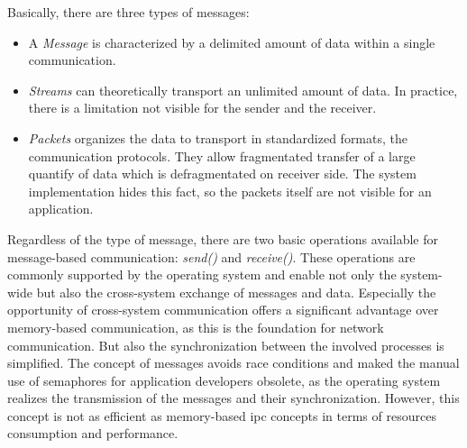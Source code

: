 Basically, there are three types of messages:
\begin{itemize}
    \item A \textit{Message} is characterized by a delimited amount of data within a single communication.
    \item \textit{Streams} can theoretically transport an unlimited amount of data. In practice, there is a limitation not visible for the sender and the receiver.
    \item \textit{Packets} organizes the data to transport in standardized formats, the communication protocols. They allow fragmentated transfer of a large quantify of data which is defragmentated on receiver side. The system implementation hides this fact, so the packets itself are not visible for an application\cite{glatz2015betriebssysteme}. 
\end{itemize}


Regardless of the type of message, there are two basic operations available for message-based communication: \textit{send()} and \textit{receive()}.
These operations are commonly supported by the operating system and enable not only the system-wide but also the cross-system exchange of messages and data\cite{glatz2015betriebssysteme}.
Especially the opportunity of cross-system communication offers a significant advantage over memory-based communication, as this is the foundation for network communication.
But also the synchronization between the involved processes is simplified. 
The concept of messages avoids race conditions and maked the manual use of semaphores for application developers obsolete, as the operating system realizes the transmission of the messages and their synchronization.
However, this concept is not as efficient as memory-based \ac{ipc} concepts in terms of resources consumption and performance\cite{glatz2015betriebssysteme}.


